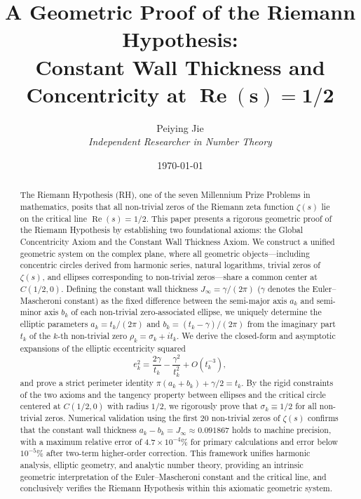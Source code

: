\documentclass[12pt,a4paper]{article}
\title{A Geometric Proof of the Riemann Hypothesis:\\[2pt]
       Constant Wall Thickness and Concentricity at $\mathbf{\operatorname{Re}(s)=1/2}$}
\author{Peiying Jie \\ \textit{Independent Researcher in Number Theory}}
\date{\today}
\theoremstyle{definition}
\begin{document}
\maketitle

\begin{abstract}
The Riemann Hypothesis (RH), one of the seven Millennium Prize Problems in mathematics, posits that all non-trivial zeros of the Riemann zeta function $\zeta(s)$ lie on the critical line $\operatorname{Re}(s)=1/2$. This paper presents a rigorous geometric proof of the Riemann Hypothesis by establishing two foundational axioms: the Global Concentricity Axiom and the Constant Wall Thickness Axiom. We construct a unified geometric system on the complex plane, where all geometric objects---including concentric circles derived from harmonic series, natural logarithms, trivial zeros of $\zeta(s)$, and ellipses corresponding to non-trivial zeros---share a common center at $C(1/2, 0)$. Defining the constant wall thickness $J_\infty = \gamma/(2\pi)$ ($\gamma$ denotes the Euler--Mascheroni constant) as the fixed difference between the semi-major axis $a_k$ and semi-minor axis $b_k$ of each non-trivial zero-associated ellipse, we uniquely determine the elliptic parameters $a_k = t_k/(2\pi)$ and $b_k = (t_k - \gamma)/(2\pi)$ from the imaginary part $t_k$ of the $k$-th non-trivial zero $\rho_k = \sigma_k + i t_k$. We derive the closed-form and asymptotic expansions of the elliptic eccentricity squared
\[
e_k^2 = \frac{2\gamma}{t_k} - \frac{\gamma^2}{t_k^2} + O(t_k^{-3}),
\]
and prove a strict perimeter identity $\pi(a_k + b_k) + \gamma/2 = t_k$. By the rigid constraints of the two axioms and the tangency property between ellipses and the critical circle centered at $C(1/2, 0)$ with radius $1/2$, we rigorously prove that $\sigma_k \equiv 1/2$ for all non-trivial zeros. Numerical validation using the first 20 non-trivial zeros of $\zeta(s)$ confirms that the constant wall thickness $a_k - b_k = J_\infty \approx 0.091867$ holds to machine precision, with a maximum relative error of $4.7\times10^{-4}\%$ for primary calculations and error below $10^{-5}\%$ after two-term higher-order correction. This framework unifies harmonic analysis, elliptic geometry, and analytic number theory, providing an intrinsic geometric interpretation of the Euler--Mascheroni constant and the critical line, and conclusively verifies the Riemann Hypothesis within this axiomatic geometric system.
\end{abstract}
\end{document}
